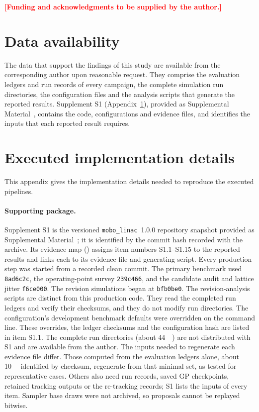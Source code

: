 \documentclass[aps,prab,reprint,superscriptaddress,amsmath,amssymb,floatfix]{revtex4-2}
\newcommand{\pending}[1]{\textcolor{red}{\textbf{[#1]}}}
\begin{document}
\begin{acknowledgments}
\pending{Funding and acknowledgments to be supplied by the author.}
\end{acknowledgments}

\section*{Data availability}
The data that support the findings of this study are available from the corresponding author
upon reasonable request. They comprise the evaluation ledgers and run records of every
campaign, the complete simulation run directories, the configuration files and the analysis
scripts that generate the reported results. Supplement S1 (Appendix~\ref{app:implementation}),
provided as Supplemental Material~\cite{SupplementalMaterial}, contains the code, configurations and
evidence files, and identifies the inputs that each reported result requires.

\appendix
\section{Executed implementation details}
\label{app:implementation}
This appendix gives the implementation details needed to reproduce the executed pipelines.

\paragraph{Supporting package.} Supplement S1 is the versioned \texttt{mobo\_linac}~1.0.0
repository snapshot provided as Supplemental Material~\cite{SupplementalMaterial}; it is
identified by the commit hash recorded with the archive. Its
evidence map
() assigns item numbers S1.1--S1.15 to the reported
results and links each to its evidence file and generating script. Every production step was
started from a recorded clean commit. The primary benchmark used \texttt{8ad6c2c}, the
operating-point survey \texttt{239c466}, and the candidate audit and lattice jitter
\texttt{f6ce000}. The revision simulations began at \texttt{bfb0be0}. The
revision-analysis scripts are distinct from this production code. They read the completed
run ledgers and verify their checksums, and they do not modify run directories. The
configuration's development benchmark defaults were overridden on the command line. These
overrides, the ledger checksums and the configuration hash are listed in item S1.1. The
complete run directories (about \SI{44}{\giga\byte}) are not distributed with S1 and are
available from the author. The inputs needed to regenerate each evidence file differ. Those computed
from the evaluation ledgers alone, about \SI{10}{\mega\byte} identified by checksum, regenerate
from that minimal set, as tested for representative cases. Others also need run records, saved
GP checkpoints, retained tracking outputs or the re-tracking records; S1 lists the inputs of
every item. Sampler base draws were not archived, so proposals cannot be replayed bitwise.
\end{document}
